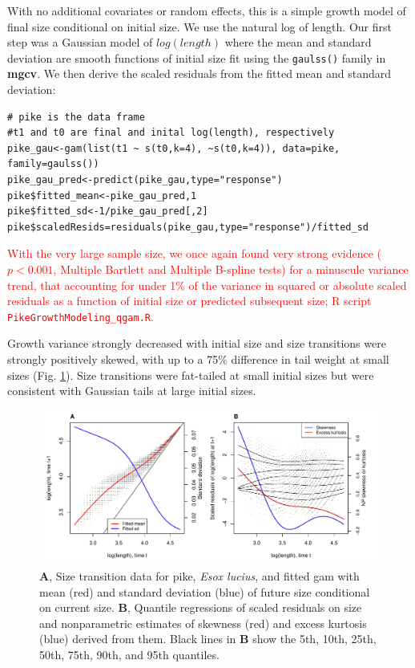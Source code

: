 \documentclass[12pt]{article}
\newcommand{\new}{\textcolor{red}}
\begin{document}
With no additional covariates or random effects, this is a simple growth model of final size conditional on initial size. 
We use the natural log of length. 
Our first step was a Gaussian model of $log(length)$ where the mean and standard deviation are smooth functions of initial size fit using the \texttt{gaulss()} family in \textbf{mgcv}. 
We then derive the scaled residuals from the fitted mean and standard deviation:
\begin{lstlisting}
# pike is the data frame
#t1 and t0 are final and inital log(length), respectively
pike_gau<-gam(list(t1 ~ s(t0,k=4), ~s(t0,k=4)), data=pike, family=gaulss())
pike_gau_pred<-predict(pike_gau,type="response")
pike$fitted_mean<-pike_gau_pred,1
pike$fitted_sd<-1/pike_gau_pred[,2]
pike$scaledResids=residuals(pike_gau,type="response")/fitted_sd
\end{lstlisting}
\new{With the very large sample size, we once again found very strong evidence ($p<0.001$, Multiple Bartlett and Multiple B-spline tests) for a minuscule variance trend, 
that accounting for under 1\% of the variance in squared or absolute scaled residuals as a function of initial size or predicted subsequent size; R script
\texttt{PikeGrowthModeling\_qgam.R}.} 

Growth variance strongly decreased with initial size and size transitions were strongly positively skewed, with up to a 75\% difference in 
tail weight at small sizes (Fig. \ref{fig:pike_diagnostics}). Size transitions were fat-tailed at small initial sizes but were consistent with 
Gaussian tails at large initial sizes. 

\begin{figure}[tbp]
	\centering
	\includegraphics[width=1.0\textwidth]{figures/pike_resid_diagnostics.pdf}
	\caption{\textbf{A}, Size transition data for pike, \emph{Esox lucius}, and fitted gam with mean (red) and standard deviation (blue) of future size conditional on current size.  \textbf{B}, Quantile regressions of scaled residuals on size and nonparametric estimates of skewness (red) and excess kurtosis (blue) derived from them. Black lines in \textbf{B} show the 5th, 10th, 25th, 50th, 75th, 90th, and 95th quantiles.}
	\label{fig:pike_diagnostics}
\end{figure} 
\end{document}
